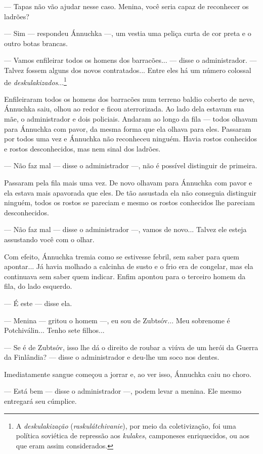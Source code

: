 --- Tapas não vão ajudar nesse caso. Menina, você seria capaz de
reconhecer os ladrões?

--- Sim --- respondeu Ánnuchka ---, um vestia uma peliça curta de cor
preta e o outro botas brancas.

--- Vamos enfileirar todos os homens dos barracões... --- disse o
administrador. --- Talvez fossem alguns dos novos contratados... Entre
eles há um número colossal de \emph{deskulakizados}...\footnote{A
  \emph{deskulakização} (\emph{raskulátchivanie}), por meio da
  coletivização, foi uma política soviética de repressão aos
  \emph{kulakes}, camponeses enriquecidos, ou aos que eram assim
  considerados.}

Enfileiraram todos os homens dos barracões num terreno baldio coberto de
neve, Ánnuchka saiu, olhou ao redor e ficou aterrorizada. Ao lado dela
estavam sua mãe, o administrador e dois policiais. Andaram ao longo da
fila --- todos olhavam para Ánnuchka com pavor, da mesma forma que ela
olhava para eles. Passaram por todos uma vez e Ánnuchka não reconheceu
ninguém. Havia rostos conhecidos e rostos desconhecidos, mas nem sinal
dos ladrões.

--- Não faz mal --- disse o administrador ---, não é possível distinguir
de primeira.

Passaram pela fila mais uma vez. De novo olhavam para Ánnuchka com pavor
e ela estava mais apavorada que eles. De tão assustada ela não conseguia
distinguir ninguém, todos os rostos se pareciam e mesmo os rostos
conhecidos lhe pareciam desconhecidos.

--- Não faz mal --- disse o administrador ---, vamos de novo... Talvez
ele esteja assustando você com o olhar.

Com efeito, Ánnuchka tremia como se estivesse febril, sem saber para
quem apontar... Já havia molhado a calcinha de susto e o frio era de
congelar, mas ela continuava sem saber quem indicar. Enfim apontou para
o terceiro homem da fila, do lado esquerdo.

--- É este --- disse ela.

--- Menina --- gritou o homem ---, eu sou de Zubtsóv... Meu sobrenome é
Potchiválin... Tenho sete filhos...

--- Se é de Zubtsóv, isso lhe dá o direito de roubar a viúva de um herói
da Guerra da Finlândia? --- disse o administrador e deu-lhe um soco nos
dentes.

Imediatamente sangue começou a jorrar e, ao ver isso, Ánnuchka caiu no
choro.

--- Está bem --- disse o administrador ---, podem levar a menina. Ele
mesmo entregará seu cúmplice.

